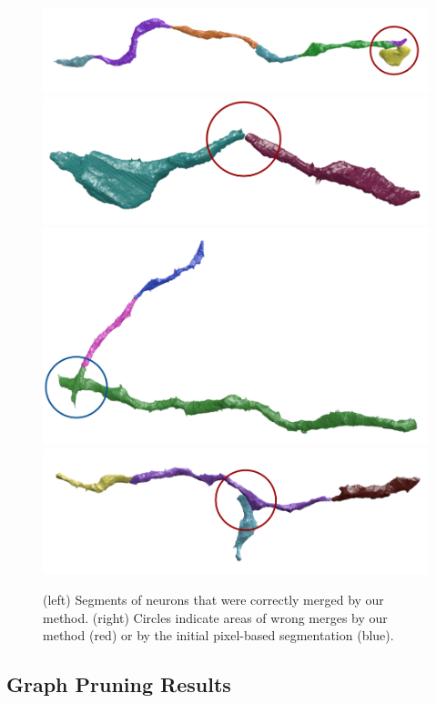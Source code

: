 \begin{figure}[t]
	\begin{minipage}{0.45\linewidth}
		\centering
		\includegraphics[width=0.85\linewidth]{./figures/VI-results/multicut-incorrect1.png}
		\includegraphics[width=0.85\linewidth]{./figures/VI-results/multicut-incorrect2.png}
		\includegraphics[width=0.85\linewidth]{./figures/VI-results/multicut-incorrect3.png}
		\includegraphics[width=0.85\linewidth]{./figures/VI-results/multicut-incorrect4.png}
	\end{minipage}
	\caption{(left) Segments of neurons that were correctly merged by our method. (right) Circles indicate areas of wrong merges by our method (red) or by the initial pixel-based segmentation (blue).}
	\label{fig:qualitative-results}
\end{figure}

\subsection{Graph Pruning Results}

